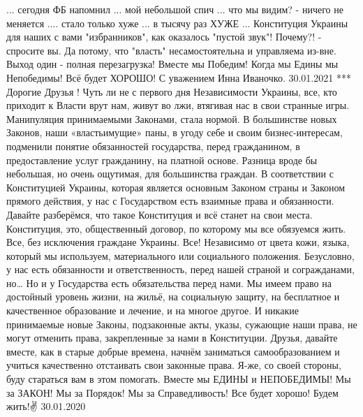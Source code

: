 \obeycr
... сегодня ФБ напомнил ... мой небольшой спич ... что мы видим? - ничего не меняется .... стало только хуже ... в тысячу раз ХУЖЕ ... 
Конституция Украины для наших с вами "избранников", как оказалось "пустой звук"!
Почему?! - спросите вы.
Да потому, что "власть" несамостоятельна и управляема из-вне.
Выход один - полная перезагрузка!
Вместе мы Победим!
Когда мы Едины мы Непобедимы!
Всё будет ХОРОШО!
С уважением Инна Иваночко.
30.01.2021
***
Дорогие Друзья !
 Чуть ли не с первого дня Независимости Украины, все, кто приходит к Власти врут нам, живут во лжи, втягивая нас в свои странные игры. Манипуляция принимаемыми Законами, стала нормой.
 В большинстве новых Законов, наши «властьимущие» паны, в угоду себе и своим бизнес-интересам, подменили понятие обязанностей государства, перед гражданином, в предоставление услуг гражданину, на платной основе. 
Разница вроде бы небольшая, но очень ощутимая, для большинства граждан. 
В соответствии с Конституцией Украины, которая является основным Законом страны и Законом прямого действия, у нас с Государством есть взаимные права и обязанности. 
Давайте разберёмся, что такое Конституция и всё станет на свои места. 
Конституция, это, общественный договор, по которому мы все обязуемся жить. 
Все, без исключения граждане Украины. 
Все! 
Независимо от цвета кожи, языка, который мы используем, материального или социального положения. 
Безусловно, у нас есть обязанности и ответственность, перед нашей страной и согражданами, но… 
Но и у Государства есть обязательства перед нами. 
Мы имеем право на достойный уровень жизни, на жильё, на социальную защиту, на бесплатное и качественное образование и лечение, и на многое другое. 
И никакие принимаемые новые Законы, подзаконные акты, указы, сужающие наши права, не могут отменить права, закрепленные за нами в Конституции. 
Друзья, давайте вместе, как в старые добрые времена, начнём заниматься самообразованием и учиться качественно отстаивать свои законные права. 
Я-же, со своей стороны, буду стараться вам в этом помогать.
Вместе мы ЕДИНЫ и НЕПОБЕДИМЫ! 
Мы за ЗАКОН! 
Мы за Порядок! 
Мы за Справедливость!
Все будет хорошо! 
Будем жить!✌
30.01.2020
\restorecr
